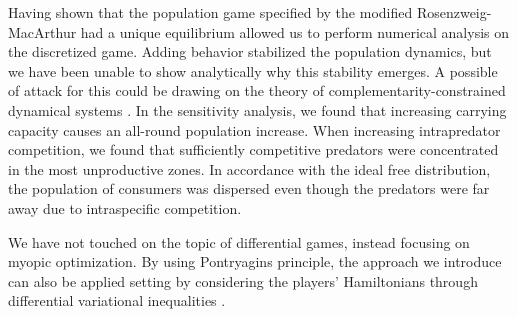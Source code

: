 Having shown that the population game specified by the modified Rosenzweig-MacArthur had a unique equilibrium allowed us to perform numerical analysis on the discretized game. Adding behavior stabilized the population dynamics, but we have been unable to show analytically why this stability emerges. A possible of attack  for this could be drawing on the theory of complementarity-constrained dynamical systems \citep{adly2018variational,brogliato2020dynamical}. In the sensitivity analysis, we found that increasing carrying capacity causes an all-round population increase. When increasing intrapredator competition, we found that sufficiently competitive predators were concentrated in the most unproductive zones. In accordance with the ideal free distribution, the population of consumers was dispersed even though the predators were far away due to intraspecific competition.



We have not touched on the topic of differential games, instead focusing on myopic optimization. By using Pontryagins principle, the approach we introduce can also be applied setting by considering the players' Hamiltonians through differential variational inequalities \citep{pang2008differential}.










